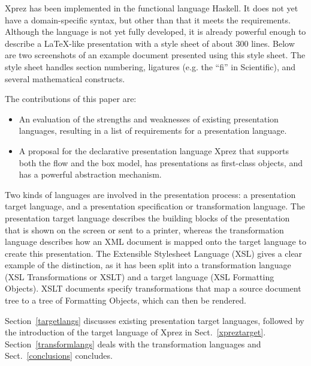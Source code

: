 \par {\sc Xprez} has been implemented in the functional language Haskell.
      It does not yet have a domain-specific syntax, but other than that it meets the
      requirements. Although the language is not yet fully developed, it is already
      powerful enough to describe a \LaTeX -like presentation with a style
      sheet of about 300 lines. Below are two screenshots of an example document
      presented using this style sheet. The style sheet handles section numbering,
      ligatures (e.g. the ``fi'' in Scientific), and several mathematical
      constructs.\begin{center}
 \qquad
{}
\end{center}
\par The contributions of this paper are:
 \begin{itemize}
 
 \item An evaluation of the strengths and weaknesses of existing
        presentation languages, resulting in a list of requirements for a presentation
        language.
 \item A proposal for the declarative presentation language {\sc Xprez}
        that supports both the flow and the box model, has presentations as first-class
        objects, and has a powerful abstraction mechanism.
 \end{itemize}

\par Two kinds of languages are involved in the presentation process: a
      presentation target language, and a presentation specification or
      transformation language. The presentation target language describes the
      building blocks of the presentation that is shown on the screen or sent to a
      printer, whereas the transformation language describes how an XML document is
      mapped onto the target language to create this presentation. The Extensible
      Stylesheet Language (XSL) gives a clear example of the distinction, as it has
      been split into a transformation language (XSL Transformations or XSLT) and a
      target language (XSL Formatting Objects). XSLT documents specify
      transformations that map a source document tree to a tree of Formatting
      Objects, which can then be rendered. 
\par Section~\ref{targetlangs} discusses existing presentation
      target languages, followed by the introduction of the target language of
      {\sc Xprez} in Sect.~\ref{xpreztarget}. Section~\ref{transformlangs} deals with the transformation languages and
      Sect.~\ref{conclusions} concludes.
